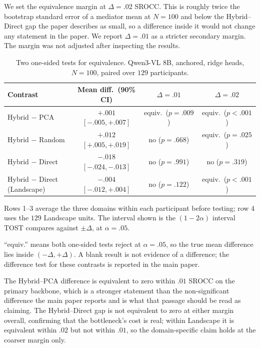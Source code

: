 We set the equivalence margin at $\Delta=.02$ SROCC. This is roughly twice the
bootstrap standard error of a mediator mean at $N=100$ and below the
Hybrid--Direct gap the paper describes as small, so a difference inside it
would not change any statement in the paper. We report $\Delta=.01$ as a
stricter secondary margin. The margin was not adjusted after inspecting the
results.

\begin{table}[t]
\centering
\begin{threeparttable}
\caption{Two one-sided tests for equivalence. Qwen3-VL 8B, anchored, ridge
heads, $N=100$, paired over $129$ participants.}
\label{tab:tost}
\small
\setlength{\tabcolsep}{4pt}
\begin{tabular}{lccc}
\toprule
Contrast & Mean diff.\ (90\% CI) & $\Delta=.01$ & $\Delta=.02$ \\
\midrule
Hybrid $-$ PCA        & $+.001$ $[-.005,+.007]$ & equiv.\ ($p{=}.009$) & equiv.\ ($p{<}.001$) \\
Hybrid $-$ Random     & $+.012$ $[+.005,+.019]$ & no ($p{=}.668$)      & equiv.\ ($p{=}.025$) \\
Hybrid $-$ Direct     & $-.018$ $[-.024,-.013]$ & no ($p{=}.991$)      & no ($p{=}.319$) \\
Hybrid $-$ Direct (Landscape) & $-.004$ $[-.012,+.004]$ & no ($p{=}.122$) & equiv.\ ($p{<}.001$) \\
\bottomrule
\end{tabular}
\begin{tablenotes}[flushleft]\footnotesize
\item Rows 1--3 average the three domains within each participant before
testing; row 4 uses the $129$ Landscape units. The interval shown is the
$(1-2\alpha)$ interval TOST compares against $\pm\Delta$, at $\alpha=.05$.
\item ``equiv.'' means both one-sided tests reject at $\alpha=.05$, so the true
mean difference lies inside $(-\Delta,+\Delta)$. A blank result is not evidence
of a difference; the difference test for these contrasts is reported in the
main paper.
\end{tablenotes}
\end{threeparttable}
\end{table}

The Hybrid--PCA difference is equivalent to zero within $.01$ SROCC on the
primary backbone, which is a stronger statement than the non-significant
difference the main paper reports and is what that passage should be read as
claiming. The Hybrid--Direct gap is not equivalent to zero at either margin
overall, confirming that the bottleneck's cost is real; within Landscape it is
equivalent within $.02$ but not within $.01$, so the domain-specific claim
holds at the coarser margin only.

